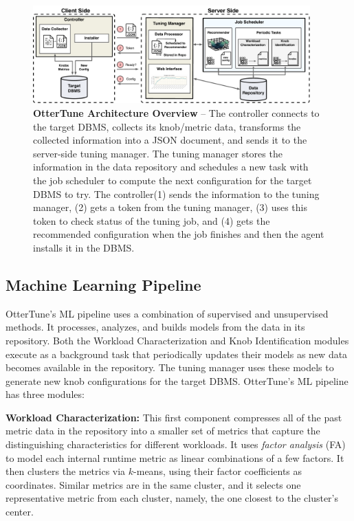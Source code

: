\documentclass[11pt,times]{article}
\newcommand{\ottertune}{OtterTune\xspace}
\newcommand{\toolClient}{controller\xspace}
\newcommand{\toolServer}{tuning manager\xspace}
\begin{document}
\begin{figure}[t!]
    \centering
    \includegraphics[width=0.95\textwidth]{figures/ottertune-overview.pdf}
    \caption{
        \textbf{\ottertune Architecture Overview} --
        The \toolClient connects to the target DBMS, collects its knob/metric
        data, transforms the collected information into a JSON document, and sends it to the 
        server-side \toolServer.
        The \toolServer stores the information in the data repository and
        schedules a new task with the job scheduler to compute the next
        configuration for the target DBMS to try. The \toolClient (1) sends the 
        information to the \toolServer, (2) gets a token from the \toolServer, (3)
        uses this token to check status of the tuning job, and (4) gets the recommended
        configuration when the job finishes and then the agent installs it in the DBMS.
    }
    \label{fig:ottertune-overview}
\end{figure}

\subsection{Machine Learning Pipeline}
\label{sec:ottertune-pipeline}
\ottertune's ML pipeline uses a combination of supervised and unsupervised methods. It processes, 
analyzes, and builds models from the data in its repository. Both the Workload Characterization and 
Knob Identification modules execute as a background task that periodically updates their models 
as new data becomes available in the repository. 
The tuning manager uses these models to generate new knob configurations for the target DBMS.
\ottertune's ML pipeline has three modules: 
\\ \vspace{-0.1in}

\textbf{Workload Characterization:}
This first component compresses all of the past metric data
in the repository into a smaller set of metrics that capture the distinguishing characteristics for 
different workloads. It uses \textit{factor analysis} (FA) to model each internal runtime metric as 
linear combinations of a few factors.
It then clusters the metrics via $k$-means, using their factor coefficients as coordinates. Similar 
metrics are in the same cluster, and it selects one representative metric from each cluster, 
namely, the one closest to the cluster's center.
\\ \vspace{-0.1in}
\end{document}

